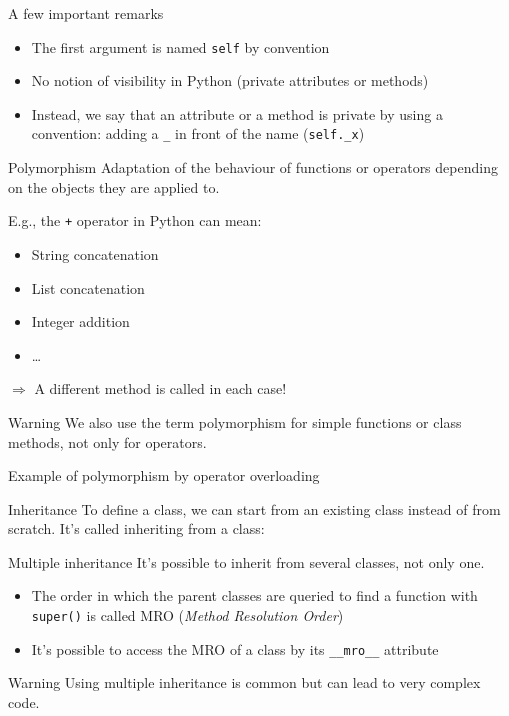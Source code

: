 \begin{frame}{A few important remarks}
  \begin{itemize}
    \item The first argument is named \texttt{self} by convention
    \item No notion of visibility in Python (private attributes or methods)
    \item Instead, we \alert{say} that an attribute or a method is private by using a convention: adding a \texttt{\_} in front of the name (\texttt{self.\_x})
  \end{itemize}
\end{frame}

\begin{frame}{Polymorphism}
  Adaptation of the behaviour of functions or operators depending on the objects they are applied to.

  E.g., the \texttt{+} operator in Python can mean:

  \begin{itemize}
    \item String concatenation
    \item List concatenation
    \item Integer addition
    \item …
  \end{itemize}

  $\Rightarrow$ A different method is called in each case!

  \begin{alertblock}{Warning}
    We also use the term polymorphism for simple functions or class methods, not only for operators.
  \end{alertblock}
\end{frame}

\begin{frame}{Example of polymorphism by operator overloading}
\end{frame}

\begin{frame}{Inheritance}
  To define a class, we can start from an existing class instead of from scratch. It's called inheriting from a class:

\end{frame}

\begin{frame}{Multiple inheritance}
  It's possible to inherit from several classes, not only one.

  \begin{itemize}
    \item The order in which the parent classes are queried to find a function with \texttt{super()} is called MRO (\textit{Method Resolution Order})
    \item It's possible to access the MRO of a class by its \texttt{\_\_mro\_\_} attribute
  \end{itemize}

  \begin{alertblock}{Warning}
    Using multiple inheritance is common but can lead to very complex code.
  \end{alertblock}
\end{frame}
